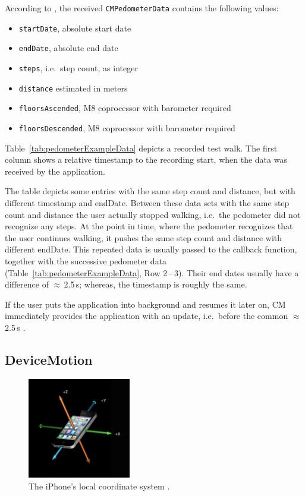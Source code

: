 According to \citet{apple:ios_doc_cm}, the received \texttt{CMPedometerData} contains the following values:
\begin{itemize}
  \item \texttt{startDate}, absolute start date
  \item \texttt{endDate}, absolute end date
  \item \texttt{steps}, i.e.\ step count, as integer
  \item \texttt{distance} estimated in meters
  \item \texttt{floorsAscended}, M8 coprocessor with barometer required
  \item \texttt{floorsDescended}, M8 coprocessor with barometer required
\end{itemize}

\noindent Table~\ref{tab:pedometerExampleData} depicts a recorded test walk. The first column shows a relative timestamp to the recording start, when the data was received by the application.

The table depicts some entries with the same step count and distance, but with different timestamp and endDate. Between these data sets with the same step count and distance the user actually stopped walking, i.e.\ the pedometer did not recognize any steps. At the point in time, where the pedometer recognizes that the user continues walking, it pushes the same step count and distance with different endDate. This repeated data is usually passed to the callback function, together with the successive pedometer data (Table~\ref{tab:pedometerExampleData}, Row 2\,--\,3). Their end dates usually have a difference of $\approx$\,2.5\,s; whereas, the timestamp is roughly the same.

If the user puts the application into background and resumes it later on, \ac{CM} immediately provides the application with an update, i.e.\ before the common $\approx$\,2.5\,s \citep{apple:wwdc_2014_pham}.


\subsection{DeviceMotion}
\begin{figure}[p]
	\includegraphics[width=0.4\textwidth]{figures/iphone_coordinatesystem}
	\caption{The iPhone's local coordinate system \citep{apple:wwdc_2012_pham}.}
	\label{fig:iphone_cs}
\end{figure}

